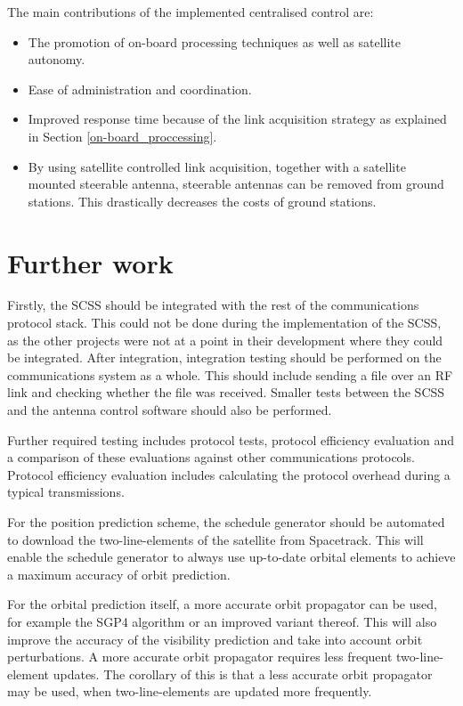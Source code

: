 The main contributions of the implemented centralised control are:
\begin{itemize}
\item The promotion of on-board processing techniques as well as satellite autonomy.
\item Ease of administration and coordination.
\item Improved response time because of the link acquisition strategy as explained in Section \ref{on-board_proccessing}.
\item By using satellite controlled link acquisition, together with a satellite mounted steerable antenna,
steerable antennas can be removed from ground stations. This drastically decreases the
costs of ground stations.
\end{itemize}


\section{Further work}
\label{further_work}

Firstly, the SCSS should be integrated with the rest of the communications protocol
stack. This could not be done during the implementation of the SCSS, as the other
projects were not at a point in their development where they could be integrated. After integration,
integration testing should be performed on the communications system as a whole.
This should include sending a file over an RF link and checking whether the file was received.
Smaller tests between the SCSS and the antenna control software should also be performed.

Further required testing includes protocol tests, protocol efficiency evaluation and a comparison
of these evaluations against other communications protocols. Protocol efficiency evaluation
includes calculating the protocol overhead during a typical transmissions.

For the position prediction scheme, the schedule generator should be automated to download
the two-line-elements of the satellite from Spacetrack. This will enable the schedule generator to
always use up-to-date orbital elements to achieve a maximum accuracy of orbit prediction.

For the orbital prediction itself, a more accurate orbit propagator can be used, for example the SGP4 algorithm
or an improved variant thereof. This will also improve the accuracy of the visibility prediction and take
into account orbit perturbations. A more accurate orbit propagator requires less frequent two-line-element
updates. The corollary of this is that a less accurate orbit propagator may be used, when
two-line-elements are updated more frequently.

